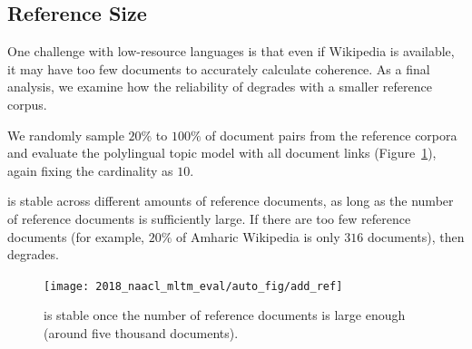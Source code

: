 \subsection{Reference Size}
\label{sec:add-ref}


One challenge with low-resource languages is that even if Wikipedia is available,
it may have too few documents to accurately calculate coherence.
As a final analysis, we examine how the reliability of \cnpmi{} degrades
with a smaller reference corpus.


We randomly sample
$20\%$ to $100\%$ of document pairs from the reference
corpora and evaluate the polylingual topic model with all document links
(Figure~\ref{fig:add-ref}), again fixing the cardinality as $10$.

\cnpmi{} is stable across different amounts of reference documents,
as long as the number of reference documents is sufficiently large.
If there are too few reference documents (for example, $20\%$ of Amharic Wikipedia is only $316$ documents),
then \cnpmi{} degrades.






































\begin{figure}[t!]
	\centering
	\texttt{[image: 2018\_naacl\_mltm\_eval/auto\_fig/add\_ref]}
	\caption{\cnpmi{} is stable once the number of reference
          documents is large enough (around five thousand documents).}
	\label{fig:add-ref}
\end{figure}